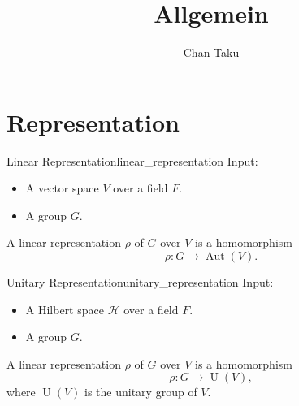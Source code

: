 \documentclass{article}
\title{Allgemein}
\author{Ch\=an Taku}
\begin{document}
\maketitle

\section{Representation}

\begin{definition}{Linear Representation}{linear_representation}
    Input:
    \begin{itemize}
        \item A vector space $V$ over a field $F$.
        \item A group $G$.
    \end{itemize}
    A linear representation $\rho$ of $G$ over $V$ is a homomorphism
    \[ \rho: G \rightarrow \operatorname{Aut}(V). \]
\end{definition}
\begin{definition}{Unitary Representation}{unitary_representation}
    Input:
    \begin{itemize}
        \item A Hilbert space $\mathcal{H}$ over a field $F$.
        \item A group $G$.
    \end{itemize}
    A linear representation $\rho$ of $G$ over $V$ is a homomorphism
    \[ \rho: G \rightarrow \operatorname{U}(V), \]
    where $\operatorname{U}(V)$ is the unitary group of $V$.
\end{definition}
\end{document}

